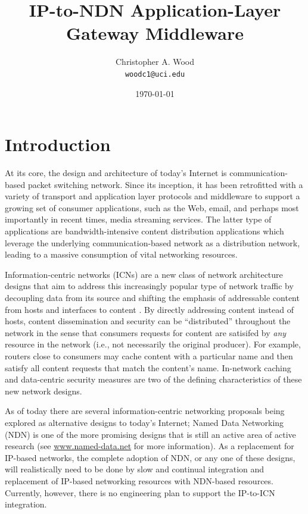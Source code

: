 \documentclass[10pt]{article}
\begin{document}
\title{IP-to-NDN Application-Layer Gateway Middleware}
\author{Christopher A. Wood \\ {\tt woodc1@uci.edu}}
\date{\today}
\maketitle


\section{Introduction}
At its core, the design and architecture of today's Internet is communication-based packet switching network. Since its inception, it has been retrofitted with a variety of transport and application layer protocols and middleware to support a growing set of consumer applications, such as the Web, email, and perhaps most importantly in recent times, media streaming services. The latter type of applications are bandwidth-intensive content distribution applications which leverage the underlying communication-based network as a distribution network, leading to a massive consumption of vital networking resources. 

Information-centric networks (ICNs) are a new class of network architecture designs that aim to address this increasingly popular type of network traffic by decoupling data from its source and shifting the emphasis of addressable content from hosts and interfaces to content \cite{first}. By directly addressing content instead of hosts, content dissemination and security can be ``distributed'' throughout the network in the sense that consumers requests for content are satisifed by \emph{any} resource in the network (i.e., not necessarily the original producer). For example, routers close to consumers may cache content with a particular name and then satisfy all content requests that match the content's name. In-network caching and data-centric security measures are two of the defining characteristics of these new network designs. 

As of today there are several information-centric networking proposals being explored as alternative designs to today's Internet; Named Data Networking (NDN) \cite{NDNtech} is one of the more promising designs that is still an active area of active research (see \url{www.named-data.net} for more information). As a replacement for IP-based networks, the complete adoption of NDN, or any one of these designs, will realistically need to be done by slow and continual integration and replacement of IP-based networking resources with NDN-based resources. Currently, however, there is no engineering plan to support the IP-to-ICN integration. 
\end{document}
